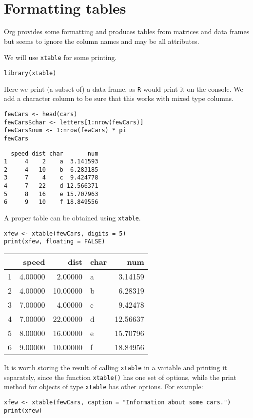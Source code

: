\documentclass[a4paper,twoside,11pt]{article}
\begin{document}
\section{Formatting tables}
\label{sec:org0789c0f}

Org provides some formatting and produces tables from matrices and data frames
but seems to ignore the column names and may be all attributes. 

We will use \texttt{xtable} for some printing.
\begin{verbatim}
library(xtable)
\end{verbatim}



Here we print (a subset of) a data frame, as \texttt{R} would print it on the console.
We add a character column to be sure that this works with mixed type columns.
\begin{verbatim}
fewCars <- head(cars)
fewCars$char <- letters[1:nrow(fewCars)]
fewCars$num <- 1:nrow(fewCars) * pi
fewCars
\end{verbatim}

\begin{verbatim}
  speed dist char       num
1     4    2    a  3.141593
2     4   10    b  6.283185
3     7    4    c  9.424778
4     7   22    d 12.566371
5     8   16    e 15.707963
6     9   10    f 18.849556
\end{verbatim}

A proper table can be obtained using \texttt{xtable}. 
\begin{verbatim}
xfew <- xtable(fewCars, digits = 5)
print(xfew, floating = FALSE)
\end{verbatim}

\begin{tabular}{rrrlr}
  \hline
 & speed & dist & char & num \\ 
  \hline
1 & 4.00000 & 2.00000 & a & 3.14159 \\ 
  2 & 4.00000 & 10.00000 & b & 6.28319 \\ 
  3 & 7.00000 & 4.00000 & c & 9.42478 \\ 
  4 & 7.00000 & 22.00000 & d & 12.56637 \\ 
  5 & 8.00000 & 16.00000 & e & 15.70796 \\ 
  6 & 9.00000 & 10.00000 & f & 18.84956 \\ 
   \hline
\end{tabular}

It is worth storing the result of calling \texttt{xtable} in a variable and printing it
separately, since the function \texttt{xtable()} has one set of options, while the
print method for objects of type \texttt{xtable} has other options.  For example:
\begin{verbatim}
xfew <- xtable(fewCars, caption = "Information about some cars.")
print(xfew)
\end{verbatim}
\end{document}
